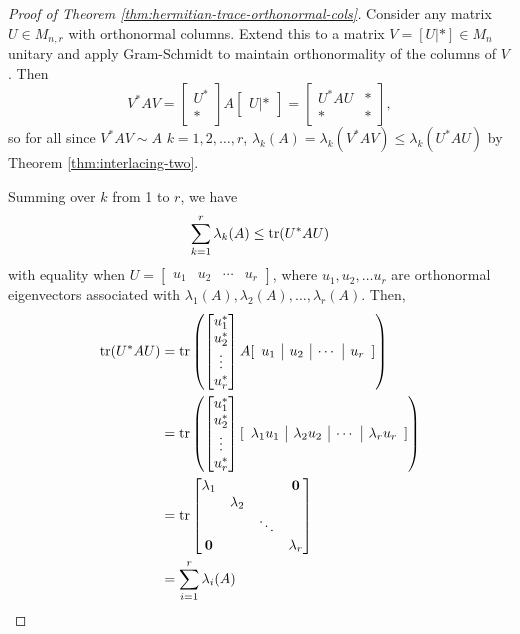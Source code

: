 \begin{proof}[Proof of Theorem \ref{thm:hermitian-trace-orthonormal-cols}]
Consider any matrix $U \in M_{n,r}$ with orthonormal columns. Extend this to a matrix $V = [U | *] \in M_n$ unitary and apply Gram-Schmidt to maintain orthonormality of the columns of $V$. Then
$$
V^*AV = \begin{bmatrix}U^* \\ *\end{bmatrix} A \begin{bmatrix}U | *\end{bmatrix} = \begin{bmatrix}U^*AU & * \\ * & * \end{bmatrix},
$$
so for all since $V^*AV \sim A$ $k = 1, 2, \dots, r$, $\lambda_k(A) = \lambda_k(V^*AV) \leq \lambda_k(U^*AU)$ by Theorem \ref{thm:interlacing-two}.

Summing over $k$ from 1 to $r$, we have
$$
\sum_{k=1}^r \lambda_k(A) \leq \operatorname{tr}(U^*AU)
$$
with equality when $U = [\begin{array}{c|c|c|c} u_1 & u_2 & \cdots & u_r \end{array}]$, where $u_1, u_2, \dots u_r$ are orthonormal eigenvectors associated with $\lambda_1(A), \lambda_2(A), \dots, \lambda_r(A)$. Then,
\begin{align*}
    \operatorname{tr}(U^*AU) 
        &= \operatorname{tr}\left(\begin{bmatrix}u_1^* \\ u_2^* \\ \vdots \\ u_r^*\end{bmatrix} A [\begin{array}{c|c|c|c} u_1 & u_2 & \cdots & u_r \end{array}]\right) \\
        &= \operatorname{tr}\left(\begin{bmatrix}u_1^* \\ u_2^* \\ \vdots \\ u_r^*\end{bmatrix} [\begin{array}{c|c|c|c} \lambda_1u_1 & \lambda_2u_2 & \cdots & \lambda_ru_r \end{array}]\right) \\
        &= \operatorname{tr}\begin{bmatrix}\lambda_1 & & & \mathbf{0} \\ & \lambda_2 & & \\ & & \ddots & \\ \mathbf{0} & & & \lambda_r\end{bmatrix} \\
        &= \sum_{i=1}^r \lambda_i(A)
\end{align*}
\end{proof}

